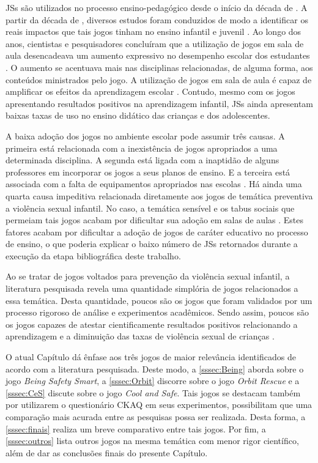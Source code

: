 \acfp{JS} são utilizados no processo ensino-pedagógico desde o início da década de \citeyear{clark1970serious}. A partir da década de \citeyear{clark1970serious}, diversos estudos foram conduzidos de modo a identificar os reais impactos que tais jogos tinham no ensino infantil e juvenil \cite{stieler2016paper}. Ao longo dos anos, cientistas e pesquisadores concluíram que a utilização de jogos em sala de aula desencadeava um aumento expressivo no desempenho escolar dos estudantes \cite{wentzel1998social}. O aumento se acentuava mais nas disciplinas relacionadas, de alguma forma, aos conteúdos ministrados pelo jogo. A utilização de jogos em sala de aula é capaz de amplificar os efeitos da aprendizagem escolar \cite{jones2020serious}. Contudo, mesmo com os jogos apresentando resultados positivos na aprendizagem infantil, \acp{JS} ainda apresentam baixas taxas de uso no ensino didático das crianças e dos adolescentes. 

A baixa adoção dos jogos no ambiente escolar pode assumir três causas. A primeira está relacionada com a inexistência de jogos apropriados a uma determinada disciplina. A segunda está ligada com a inaptidão de alguns professores em incorporar os jogos a seus planos de ensino. E a terceira está associada com a falta de equipamentos apropriados nas escolas \cite{colleen2016advancing}. Há ainda uma quarta causa impeditiva relacionada diretamente aos jogos de temática preventiva a violência sexual infantil. No caso, a temática sensível e os tabus sociais que permeiam tais jogos acabam por dificultar sua adoção em salas de aulas \cite{chen2007prevention}. Estes fatores acabam por dificultar a adoção de jogos de caráter educativo no processo de ensino, o que poderia explicar o baixo número de \acp{JS} retornados durante a execução da etapa bibliográfica deste trabalho.

Ao se tratar de jogos voltados para prevenção da violência sexual infantil, a literatura pesquisada revela uma quantidade simplória de jogos relacionados a essa temática. Desta quantidade, poucos são os jogos que foram validados por um processo rigoroso de análise e experimentos acadêmicos. Sendo assim, poucos são os jogos capazes de atestar cientificamente resultados positivos relacionando a aprendizagem e a diminuição das taxas de violência sexual de crianças \cite{jones2010being}.

O atual Capítulo dá ênfase aos três jogos de maior relevância identificados de acordo com a literatura pesquisada. Deste modo, a \autoref{sssec:Being} aborda sobre o jogo \textit{Being Safety Smart}, a \autoref{sssec:Orbit} discorre sobre o jogo \textit{Orbit Rescue} e a \autoref{sssec:CeS} discute sobre o jogo \textit{Cool and Safe}. Tais jogos se destacam também por utilizarem o questionário \ac{CKAQ} em seus experimentos, possibilitam que uma comparação mais acurada entre as pesquisas possa ser realizada. Desta forma, a \autoref{sssec:finais} realiza um breve comparativo entre tais jogos. Por fim, a \autoref{sssec:outros} lista outros jogos na mesma temática com menor rigor científico, além de dar as conclusões finais do presente Capítulo. 

